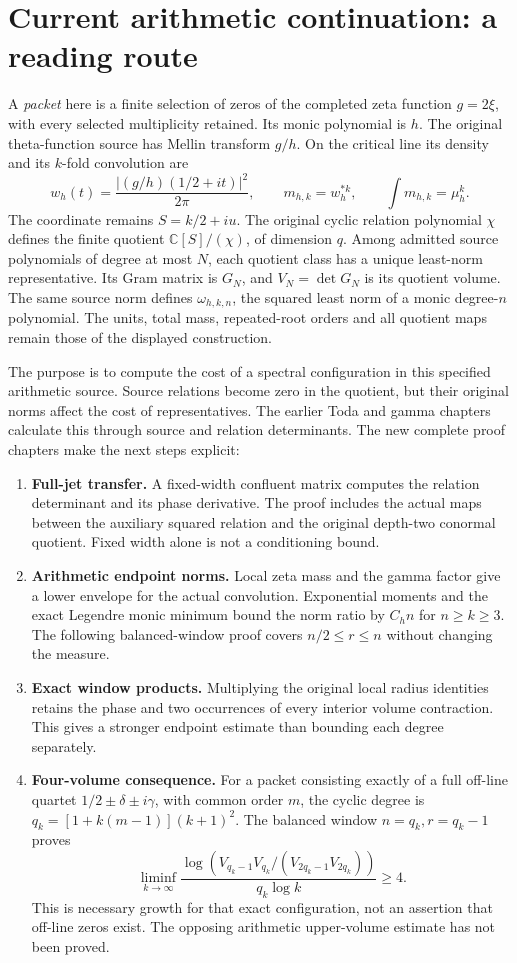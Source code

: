 \section*{Current arithmetic continuation: a reading route}

A \emph{packet} here is a finite selection of zeros of the completed zeta
function $g=2\xi$, with every selected multiplicity retained. Its monic
polynomial is $h$. The original theta-function source has Mellin transform
$g/h$. On the critical line its density and its $k$-fold convolution are
\[
w_h(t)=\frac{|(g/h)(1/2+it)|^2}{2\pi},\qquad
m_{h,k}=w_h^{*k},\qquad \int m_{h,k}=\mu_h^k.
\]
The coordinate remains $S=k/2+iu$. The original cyclic relation polynomial
$\chi$ defines the finite quotient $\mathbb C[S]/(\chi)$, of dimension $q$.
Among admitted source polynomials of degree at most $N$, each quotient
class has a unique least-norm representative. Its Gram matrix is $G_N$,
and $V_N=\det G_N$ is its quotient volume. The same source norm defines
$\omega_{h,k,n}$, the squared least norm of a monic degree-$n$ polynomial.
The units, total mass, repeated-root orders and all quotient maps remain
those of the displayed construction.

The purpose is to compute the cost of a spectral configuration in this
specified arithmetic source. Source relations become zero in the quotient,
but their original norms affect the cost of representatives. The earlier
Toda and gamma chapters calculate this through source and relation
determinants. The new complete proof chapters make the next steps explicit:
\begin{enumerate}
\item \textbf{Full-jet transfer.} A fixed-width confluent matrix computes
the relation determinant and its phase derivative. The proof includes
the actual maps between the auxiliary squared relation and the original
depth-two conormal quotient. Fixed width alone is not a conditioning bound.
\item \textbf{Arithmetic endpoint norms.} Local zeta mass and the gamma
factor give a lower envelope for the actual convolution. Exponential
moments and the exact Legendre monic minimum bound the norm ratio by
$C_hn$ for $n\ge k\ge3$. The following balanced-window proof covers
$n/2\le r\le n$ without changing the measure.
\item \textbf{Exact window products.} Multiplying the original local
radius identities retains the phase and two occurrences of every interior
volume contraction. This gives a stronger endpoint estimate than bounding
each degree separately.
\item \textbf{Four-volume consequence.} For a packet consisting exactly of
a full off-line quartet $1/2\pm\delta\pm i\gamma$, with common order $m$,
the cyclic degree is $q_k=[1+k(m-1)](k+1)^2$. The balanced window
$n=q_k,r=q_k-1$ proves
\[
\liminf_{k\to\infty}
\frac{\log(V_{q_k-1}V_{q_k}/(V_{2q_k-1}V_{2q_k}))}{q_k\log k}\ge4.
\]
This is necessary growth for that exact configuration, not an assertion
that off-line zeros exist. The opposing arithmetic upper-volume estimate
has not been proved.
\end{enumerate}

